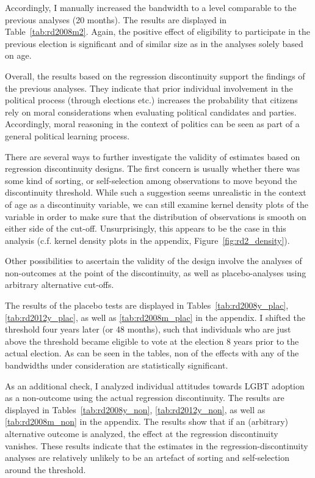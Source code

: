 \documentclass[12pt]{article}
\begin{document}


Accordingly, I manually increased the bandwidth to a level comparable to the previous analyses (20 months). The results are displayed in Table~\ref{tab:rd2008m2}. Again, the positive effect of eligibility to participate in the previous election is significant and of similar size as in the analyses solely based on age.

Overall, the results based on the regression discontinuity support the findings of the previous analyses. They indicate that prior individual involvement in the political process (through elections etc.) increases the probability that citizens rely on moral considerations when evaluating political candidates and parties. Accordingly, moral reasoning in the context of politics can be seen as part of a general political learning process.

There are several ways to further investigate the validity of estimates based on regression discontinuity designs. The first concern is usually whether there was some kind of sorting, or self-selection among observations to move beyond the discontinuity threshold. While such a suggestion seems unrealistic in the context of age as a discontinuity variable, we can still examine kernel density plots of the variable in order to make sure that the distribution of observations is smooth on either side of the cut-off. Unsurprisingly, this appears to be the case in this analysis (c.f. kernel density plots in the appendix, Figure~\ref{fig:rd2_density}).

Other possibilities to ascertain the validity of the design involve the analyses of non-outcomes at the point of the discontinuity, as well as placebo-analyses using arbitrary alternative cut-offs.

The results of the placebo tests are displayed in Tables~\ref{tab:rd2008y_plac}, \ref{tab:rd2012y_plac}, as well as \ref{tab:rd2008m_plac} in the appendix. I shifted the threshold four years later (or 48 months), such that individuals who are just above the threshold became eligible to vote at the election 8 years prior to the actual election. As can be seen in the tables, non of the effects with any of the bandwidths under consideration are statistically significant.

As an additional check, I analyzed individual attitudes towards LGBT adoption as a non-outcome using the actual regression discontinuity. The results are displayed in Tables~\ref{tab:rd2008y_non}, \ref{tab:rd2012y_non}, as well as \ref{tab:rd2008m_non} in the appendix. The results show that if an (arbitrary) alternative outcome is analyzed, the effect at the regression discontinuity vanishes. These results indicate that the estimates in the regression-discontinuity analyses are relatively unlikely to be an artefact of sorting and self-selection around the threshold.
\end{document}
